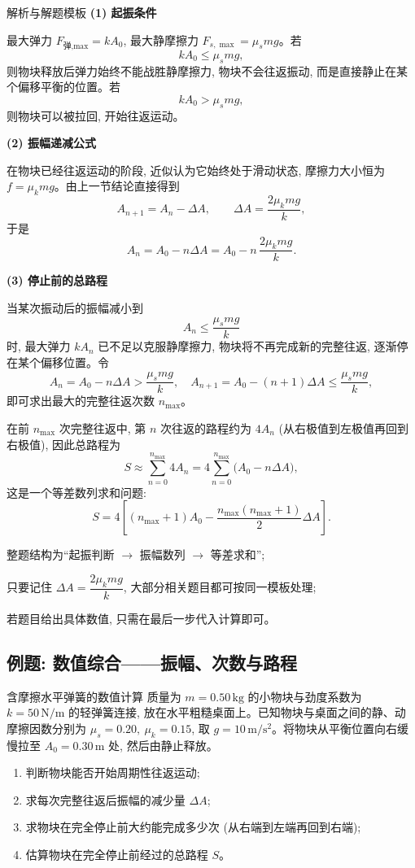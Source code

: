 \documentclass[a4paper,11pt]{ctexart}
\begin{document}
\begin{proofbox}{解析与解题模板}
\textbf{(1) 起振条件}

最大弹力 $F_{\text{弹,max}}=kA_0$, 最大静摩擦力 $F_{s,\max}=\mu_s mg$。若
\[
  kA_0 \le \mu_s mg,
\]
则物块释放后弹力始终不能战胜静摩擦力, 物块不会往返振动, 而是直接静止在某个偏移平衡的位置。若
\[
  kA_0 > \mu_s mg,
\]
则物块可以被拉回, 开始往返运动。

\medskip
\textbf{(2) 振幅递减公式}

在物块已经往返运动的阶段, 近似认为它始终处于滑动状态, 摩擦力大小恒为 $f=\mu_k mg$。由上一节结论直接得到
\[
  A_{n+1}=A_n-\Delta A,\qquad 
  \Delta A=\dfrac{2\mu_k mg}{k},
\]
于是
\[
  A_n = A_0 - n\Delta A
      = A_0 - n\,\dfrac{2\mu_k mg}{k}.
\]

\medskip
\textbf{(3) 停止前的总路程}

当某次振动后的振幅减小到
\[
  A_n \le \frac{\mu_s mg}{k}
\]
时, 最大弹力 $kA_n$ 已不足以克服静摩擦力, 物块将不再完成新的完整往返, 逐渐停在某个偏移位置。令
\[
  A_n = A_0 - n\Delta A > \frac{\mu_s mg}{k},\quad
  A_{n+1} = A_0 - (n+1)\Delta A \le \frac{\mu_s mg}{k},
\]
即可求出最大的完整往返次数 $n_{\max}$。

在前 $n_{\max}$ 次完整往返中, 第 $n$ 次往返的路程约为 $4A_n$ (从右极值到左极值再回到右极值), 因此总路程为
\[
  S \approx \sum_{n=0}^{n_{\max}} 4A_n
   = 4\sum_{n=0}^{n_{\max}}\bigl(A_0 - n\Delta A\bigr),
\]
这是一个等差数列求和问题:
\[
  S = 4\left[(n_{\max}+1)A_0 - \frac{n_{\max}(n_{\max}+1)}{2}\Delta A\right].
\]

\begin{focuspoints}
  \item 整题结构为“起振判断 $\rightarrow$ 振幅数列 $\rightarrow$ 等差求和”;
  \item 只要记住 $\Delta A=\dfrac{2\mu_k mg}{k}$, 大部分相关题目都可按同一模板处理;
  \item 若题目给出具体数值, 只需在最后一步代入计算即可。
\end{focuspoints}
\end{proofbox}

\subsection{例题: 数值综合——振幅、次数与路程}

\begin{examplebox}{含摩擦水平弹簧的数值计算}
质量为 $m=0.50\,\mathrm{kg}$ 的小物块与劲度系数为 $k=50\,\mathrm{N/m}$ 的轻弹簧连接, 放在水平粗糙桌面上。已知物块与桌面之间的静、动摩擦因数分别为 $\mu_s=0.20,\ \mu_k=0.15$, 取 $g=10\,\mathrm{m/s^2}$。将物块从平衡位置向右缓慢拉至 $A_0=0.30\,\mathrm{m}$ 处, 然后由静止释放。

\begin{enumerate}
  \item 判断物块能否开始周期性往返运动;
  \item 求每次完整往返后振幅的减少量 $\Delta A$;
  \item 求物块在完全停止前大约能完成多少次 (从右端到左端再回到右端);
  \item 估算物块在完全停止前经过的总路程 $S$。
\end{enumerate}
\end{examplebox}
\end{document}
